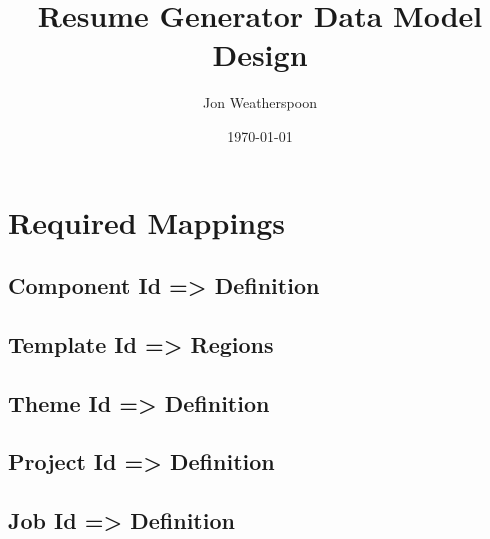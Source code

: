 \documentclass[12pt]{article}
\author{Jon Weatherspoon}
\date{\today}
\title{Resume Generator Data Model Design}
\begin{document}
    \maketitle

    \tableofcontents

    \section{Required Mappings}
    \subsection{Component Id => Definition}

    \subsection{Template Id => Regions}

    \subsection{Theme Id => Definition}

    \subsection{Project Id => Definition}

    \subsection{Job Id => Definition}
\end{document}
